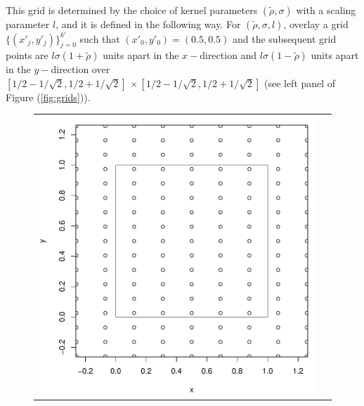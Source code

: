 \documentclass[10pt]{article}
\begin{document}
This grid is determined by the choice of kernel parameters
$(\tilde{\rho}, \sigma)$ with a scaling parameter $l$, and it is
defined in the following way. For $(\tilde{\rho}, \sigma, l)$, overlay
a grid $\{ (x'_j, y'_j) \}_{j=0}^{k'}$ such that
$(x'_0, y'_0) = (0.5,0.5)$ and the subsequent grid points are
$l\sigma(1 + \tilde{\rho})$ units apart in the $x-$direction and
$l\sigma(1 - \tilde{\rho})$ units apart in the $y-$direction over
$[1/2 - 1/\sqrt{2}, 1/2 + 1/\sqrt{2}] \, \times [1/2 - 1/\sqrt{2}, 1/2
+ 1/\sqrt{2}]$ (see left panel of Figure (\ref{fig:grids})).
\begin{figure}
  \centering
  \begin{tabular}{cc}
    \begin{minipage}{0.4\textwidth}
      \centering
      \includegraphics[width=1\linewidth]{nodes-1.pdf}
    \end{minipage}
    & \begin{minipage}{0.4\textwidth}
      \centering

\end{minipage}
\end{tabular}
\end{figure}
\end{document}
